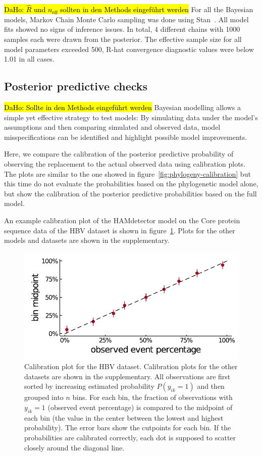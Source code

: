 \documentclass[fleqn,11pt]{SelfArx} %
\begin{document}
\hl{DaHo: $\hat{R}$ und $n_{\mathrm{eff}}$ sollten in den Methods eingeführt werden}
For all the Bayesian models, Markov Chain Monte Carlo sampling was done using Stan~\cite{Stan2021}. All model fits showed no signs of inference issues. In total, 4 different chains with 1000 samples each were drawn from the posterior. The effective sample size for all model parameters exceeded 500, R-hat convergence diagnostic values were below 1.01 in all cases.

\subsection*{Posterior predictive checks}
\hl{DaHo: Sollte in den Methods eingeführt werden}
Bayesian modelling allows a simple yet effective strategy to test models: By simulating data under the model's assumptions and then comparing simulated and observed data, model misspecifications can be identified and highlight possible model improvements.

Here, we compare the calibration of the posterior predictive probability of observing the replacement to the actual observed data using calibration plots.
The plots are similar to the one showed in figure~\ref{fig:phylogeny-calibration} but this time do not evaluate the probabilities based on the phylogenetic model alone, but show the calibration of the posterior predictive probabilities based on the full model.

An example calibration plot of the HAMdetector model on the Core protein sequence data of the HBV dataset is shown in figure~\ref{fig:calibration}. Plots for the other models and datasets are shown in the supplementary.

\begin{figure}[!ht]
  \includegraphics[width=1\linewidth]{plots/phylogeny_calibration.pdf}
  \caption{Calibration plot for the HBV dataset. Calibration plots for the other datasets are shown in the supplementary.
  All observations are first sorted by increasing estimated probability \(P(y_{ik}=1)\) and then grouped into \(n\) bins.
  For each bin, the fraction of observations with \(y_{ik}=1\) (observed event percentage) is compared to the midpoint of each bin (the value in the center between the lowest and highest probability). The error bars show the cutpoints for each bin. If the probabilities are calibrated correctly, each dot is supposed to scatter closely around the diagonal line.}
  \label{fig:calibration}
\end{figure}
\end{document}
